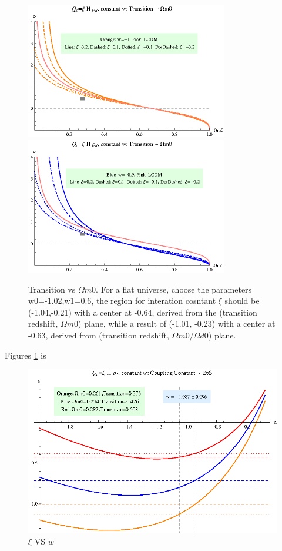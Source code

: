 \documentclass[12pt,a4paper]{article}
\begin{document}
\begin{figure}
\centering
\includegraphics[width=250pt]{rhod_I2CC_TransVSOmegam01.eps}
\includegraphics[width=250pt]{rhod_I2CC_TransVSOmegam02.eps}
\caption{Transition vs $\Omega m0$. For a flat universe, choose the parameters {w0=-1.02,w1=0.6}, the region for interation cosntant $\xi$ should be  (-1.04,-0.21) with a center at -0.64, derived from the (transition redshift, $\Omega m0$) plane, while a result of (-1.01, -0.23) with a center at -0.63, derived from (transition redshift, $\Omega m0$/$\Omega d0$) plane.}\label{fig-rhod_I2CC_TransVSOmegam0}
\end{figure}

Figures \ref{fig-rhod_I2CC_TransVSOmegam0} is


\begin{figure}
\centering
\includegraphics[width=500pt]{rhod_I2CC_xiVSw.eps}
\caption{$\xi$ VS $w$}\label{fig-rhod_I2CC_xiVSw}
\end{figure}
\end{document}
